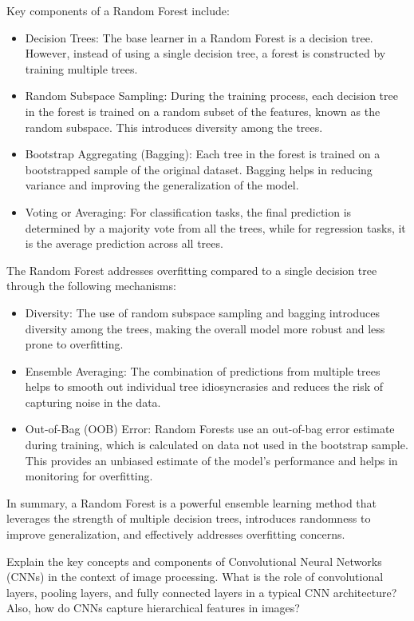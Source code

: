 \documentclass[a4paper,11pt,addpoints]{exam}
\begin{document}
\begin{questions}
\begin{solution}[5in]
Key components of a Random Forest include:
\begin{itemize}
\item Decision Trees: The base learner in a Random Forest is a decision tree. However, instead of using a single decision tree, a forest is constructed by training multiple trees.
\item Random Subspace Sampling: During the training process, each decision tree in the forest is trained on a random subset of the features, known as the random subspace. This introduces diversity among the trees.
\item Bootstrap Aggregating (Bagging): Each tree in the forest is trained on a bootstrapped sample of the original dataset. Bagging helps in reducing variance and improving the generalization of the model.
\item Voting or Averaging: For classification tasks, the final prediction is determined by a majority vote from all the trees, while for regression tasks, it is the average prediction across all trees.
\end{itemize}
The Random Forest addresses overfitting compared to a single decision tree through the following mechanisms:
\begin{itemize}
\item Diversity: The use of random subspace sampling and bagging introduces diversity among the trees, making the overall model more robust and less prone to overfitting.
\item Ensemble Averaging: The combination of predictions from multiple trees helps to smooth out individual tree idiosyncrasies and reduces the risk of capturing noise in the data.
\item Out-of-Bag (OOB) Error: Random Forests use an out-of-bag error estimate during training, which is calculated on data not used in the bootstrap sample. This provides an unbiased estimate of the model's performance and helps in monitoring for overfitting.
\end{itemize}
In summary, a Random Forest is a powerful ensemble learning method that leverages the strength of multiple decision trees, introduces randomness to improve generalization, and effectively addresses overfitting concerns.
    
    \end{solution}

    \question[10]
    Explain the key concepts and components of Convolutional Neural Networks (CNNs) in the context of image processing. What is the role of convolutional layers, pooling layers, and fully connected layers in a typical CNN architecture? Also, how do CNNs capture hierarchical features in images?
    

\end{questions}
\end{document}
